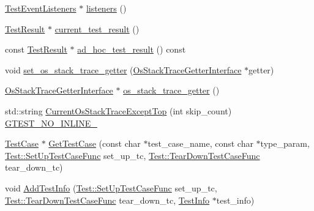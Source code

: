 \begin{DoxyCompactItemize}
\hyperlink{classtesting_1_1TestEventListeners}{Test\+Event\+Listeners} $\ast$ \hyperlink{classtesting_1_1internal_1_1UnitTestImpl_a67211f8475936f88d0e4d30f841c0da4}{listeners} ()
\item 
\hyperlink{classtesting_1_1TestResult}{Test\+Result} $\ast$ \hyperlink{classtesting_1_1internal_1_1UnitTestImpl_aba3caef4ad23ce98be80250aeb0cc787}{current\+\_\+test\+\_\+result} ()
\item 
const \hyperlink{classtesting_1_1TestResult}{Test\+Result} $\ast$ \hyperlink{classtesting_1_1internal_1_1UnitTestImpl_a8be26dc90e0fac8f8be3552ffd98c69c}{ad\+\_\+hoc\+\_\+test\+\_\+result} () const
\item 
void \hyperlink{classtesting_1_1internal_1_1UnitTestImpl_a3306f7d2b19bca54b841006e4a2e0260}{set\+\_\+os\+\_\+stack\+\_\+trace\+\_\+getter} (\hyperlink{classtesting_1_1internal_1_1OsStackTraceGetterInterface}{Os\+Stack\+Trace\+Getter\+Interface} $\ast$getter)
\item 
\hyperlink{classtesting_1_1internal_1_1OsStackTraceGetterInterface}{Os\+Stack\+Trace\+Getter\+Interface} $\ast$ \hyperlink{classtesting_1_1internal_1_1UnitTestImpl_a71753679854f7fbba6c1568eb422fecb}{os\+\_\+stack\+\_\+trace\+\_\+getter} ()
\item 
std\+::string \hyperlink{classtesting_1_1internal_1_1UnitTestImpl_a61c0a51ac4e57d9f884f646ca6dd2210}{Current\+Os\+Stack\+Trace\+Except\+Top} (int skip\+\_\+count) \hyperlink{gtest-port_8h_a9945cbd967fbccb15f8de711f58955c7}{G\+T\+E\+S\+T\+\_\+\+N\+O\+\_\+\+I\+N\+L\+I\+N\+E\+\_\+}
\item 
\hyperlink{classtesting_1_1TestCase}{Test\+Case} $\ast$ \hyperlink{classtesting_1_1internal_1_1UnitTestImpl_ac5684d824a59e963cb3274c79d0b6df3}{Get\+Test\+Case} (const char $\ast$test\+\_\+case\+\_\+name, const char $\ast$type\+\_\+param, \hyperlink{classtesting_1_1Test_a5f2a051d1d99c9b784c666c586186cf9}{Test\+::\+Set\+Up\+Test\+Case\+Func} set\+\_\+up\+\_\+tc, \hyperlink{classtesting_1_1Test_aa0f532e93b9f3500144c53f31466976c}{Test\+::\+Tear\+Down\+Test\+Case\+Func} tear\+\_\+down\+\_\+tc)
\item 
void \hyperlink{classtesting_1_1internal_1_1UnitTestImpl_a1cc87dfc91377ebec4a3ff4192dfcba9}{Add\+Test\+Info} (\hyperlink{classtesting_1_1Test_a5f2a051d1d99c9b784c666c586186cf9}{Test\+::\+Set\+Up\+Test\+Case\+Func} set\+\_\+up\+\_\+tc, \hyperlink{classtesting_1_1Test_aa0f532e93b9f3500144c53f31466976c}{Test\+::\+Tear\+Down\+Test\+Case\+Func} tear\+\_\+down\+\_\+tc, \hyperlink{classtesting_1_1TestInfo}{Test\+Info} $\ast$test\+\_\+info)
\item 

\end{DoxyCompactItemize}
